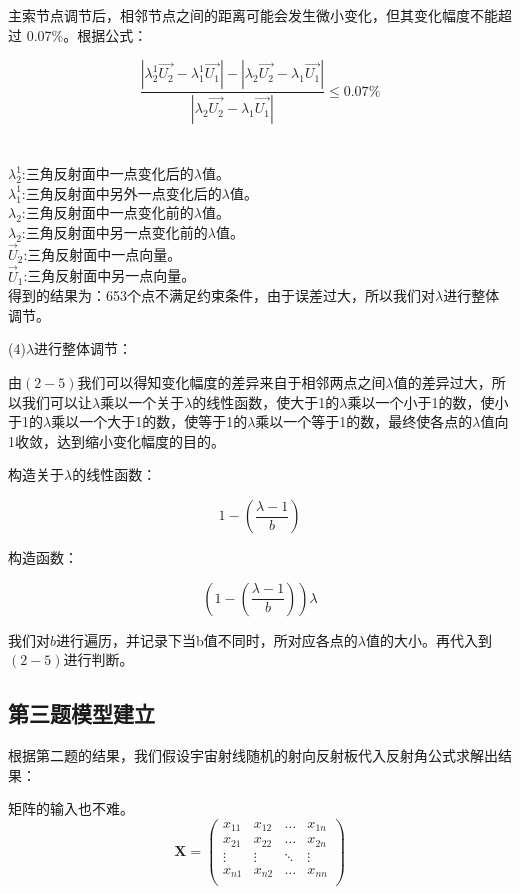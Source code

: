\documentclass[withoutpreface,bwprint]{cumcmthesis} %
\numberwithin{equation}{subsection}
\begin{document}
主索节点调节后，相邻节点之间的距离可能会发生微小变化，但其变化幅度不能超过 0.07\%。根据公式：

\begin{equation}
	\frac{|\lambda_2^{1}\vec{U_2}-\lambda_1^{1}\vec{U_1}|-|\lambda_2\vec{U_2}-\lambda_1\vec{U_1}|}{|\lambda_2\vec{U_2}-\lambda_1\vec{U_1}|}\le0.07\%
\end{equation} \\
\\
$\lambda_2^{1}$:三角反射面中一点变化后的$\lambda$值。\\
$\lambda_1^{1}$:三角反射面中另外一点变化后的$\lambda$值。\\
$\lambda_2$:三角反射面中一点变化前的$\lambda$值。\\
$\lambda_2$:三角反射面中另一点变化前的$\lambda$值。\\
$\vec{U}_2$:三角反射面中一点向量。\\
$\vec{U}_1$:三角反射面中另一点向量。\\

得到的结果为：653个点不满足约束条件，由于误差过大，所以我们对$\lambda$进行整体调节。

(4)$\lambda$进行整体调节：

由$(2-5)$我们可以得知变化幅度的差异来自于相邻两点之间$\lambda$值的差异过大，所以我们可以让$\lambda$乘以一个关于$\lambda$的线性函数，使大于1的$\lambda$乘以一个小于1的数，使小于1的$\lambda$乘以一个大于1的数，使等于1的$\lambda$乘以一个等于1的数，最终使各点的$\lambda$值向1收敛，达到缩小变化幅度的目的。

构造关于$\lambda$的线性函数：

\begin{equation}
1-(\frac{\lambda-1}{b})
\end{equation}

构造函数：

\begin{equation}
	(1-(\frac{\lambda-1}{b}))\lambda
\end{equation}

我们对$b$进行遍历，并记录下当b值不同时，所对应各点的$\lambda$值的大小。再代入到$(2-5)$进行判断。

\subsection{第三题模型建立}

根据第二题的结果，我们假设宇宙射线随机的射向反射板代入反射角公式求解出结果：


矩阵的输入也不难。
\[
\mathbf{X} = \left(
    \begin{array}{cccc}
    x_{11} & x_{12} & \ldots & x_{1n}\\
    x_{21} & x_{22} & \ldots & x_{2n}\\
    \vdots & \vdots & \ddots & \vdots\\
    x_{n1} & x_{n2} & \ldots & x_{nn}\\
    \end{array} \right)
\]
\end{document}
